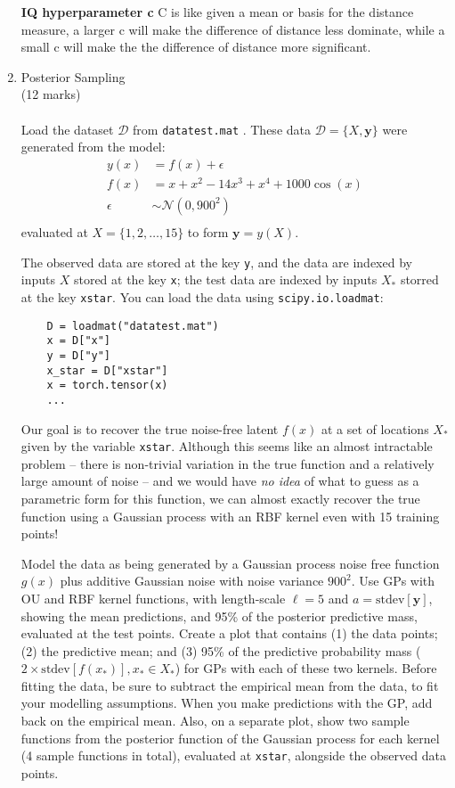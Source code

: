 \documentclass[11pt]{article}
\newcommand{\mbf}[1]{{\boldsymbol{\mathbf{#1}}}}
\renewcommand{\bm}{\mbf}
\begin{document}
\begin{enumerate}
\textbf{IQ hyperparameter c}
C is like given a mean or basis for the distance measure, a larger c will make the difference of distance less dominate, while a small c will make the the difference of distance more significant.

\item Posterior Sampling \\ 
(12 marks)
\\ \\
Load the dataset $\mathcal{D}$ from \texttt{datatest.mat} .  
These data $\mathcal{D} = \{X,\bm{y}\}$ were generated from the model:
\begin{align}
y(x) &= f(x) + \epsilon \\
f(x) &= x + x^2 - 14 x^3 + x^4 + 1000\cos(x) \\
\epsilon &\sim \mathcal{N}(0,900^2) \\
\end{align}
evaluated at $X= \{1,2,\dots,15\}$ to form $\bm{y} = y(X)$.

The observed data are stored at the key \texttt{y}, 
and the data are indexed by inputs $X$ stored at the key \texttt{x};
the test data are indexed by inputs $X_*$ storred at the key
\texttt{xstar}. You can load the data using \texttt{scipy.io.loadmat}:
\begin{lstlisting}
    D = loadmat("datatest.mat")
    x = D["x"]
    y = D["y"]
    x_star = D["xstar"]	
    x = torch.tensor(x)
    ...
\end{lstlisting}

Our goal is to recover the true noise-free latent $f(x)$ at a set of locations $X_*$ given by the variable \texttt{xstar}.  Although this seems like an almost intractable problem -- there is non-trivial variation in the true function and a relatively large amount of noise -- and we would have \emph{no idea} of what to guess as a parametric form for this function, 
we can almost exactly recover the true function using a Gaussian process with an RBF kernel even with 15 training points!

Model the data as being generated by a Gaussian process noise free function $g(x)$ plus additive Gaussian noise with noise variance $900^2$.  Use GPs with OU and RBF kernel functions, with length-scale $\ell = 5$ and $a = \text{stdev}[\bm{y}]$, showing the mean predictions, and 95\% of the posterior predictive mass, evaluated at the test points.  Create a plot that contains (1) the data points; (2) the predictive mean; and (3) 95\% of the predictive probability mass ($2 \times \text{stdev}[f(x_*)], x_* \in X_*$) for GPs with each of these two kernels.  Before fitting the data, be sure to subtract the empirical mean from the data, to fit your modelling assumptions.  When you make predictions with the GP, add back on the empirical mean.  Also, on a separate plot, show two sample functions from the posterior function of the Gaussian process for each kernel (4 sample functions in total), evaluated at \texttt{xstar}, alongside the observed data points.


\end{enumerate}
\end{document}
